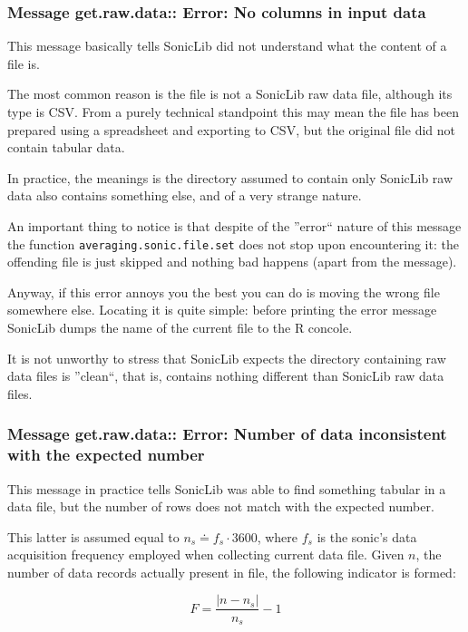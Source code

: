 \documentclass[a4paper,10pt]{book}
\begin{document}
\subsubsection{Message get.raw.data:: Error: No columns in input data}

This message basically tells SonicLib did not understand what the content of a file is.

The most common reason is the file is not a SonicLib raw data file, although its type is CSV. From a purely technical standpoint this may mean the file has been prepared using a spreadsheet and exporting to CSV, but the original file did not contain tabular data.

In practice, the meanings is the directory assumed to contain only SonicLib raw data also contains something else, and of a very strange nature.

An important thing to notice is that despite of the ''error`` nature of this message the function \verb|averaging.sonic.file.set| does not stop upon encountering it: the offending file is just skipped and nothing bad happens (apart from the message).

Anyway, if this error annoys you the best you can do is moving the wrong file somewhere else. Locating it is quite simple: before printing the error message SonicLib dumps the name of the current file to the R concole.

It is not unworthy to stress that SonicLib expects the directory containing raw data files is ''clean``, that is, contains nothing different than SonicLib raw data files.

\subsubsection{Message get.raw.data:: Error: Number of data inconsistent with the expected number}

This message in practice tells SonicLib was able to find something tabular in a data file, but the number of rows does not match with the expected number.

This latter is assumed equal to $n_{s} \doteq f_{s} \cdot 3600$, where $f_{s}$ is the sonic's data acquisition frequency employed when collecting current data file. Given $n$, the number of data records actually present in file, the following indicator is formed:

\begin{equation}\label{eq:F indicator}
  F = \frac{\left| n - n_{s} \right|}{n_{s}} - 1
\end{equation}
\end{document}
